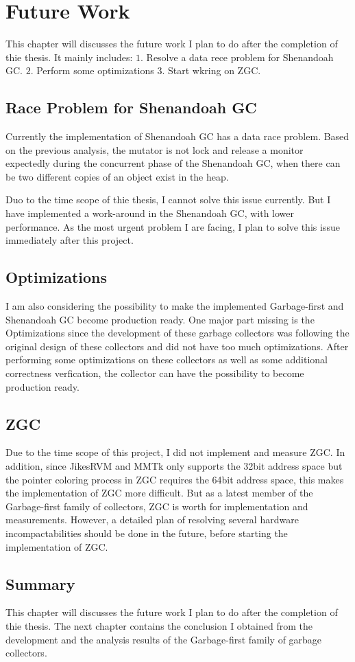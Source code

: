 \chapter{Future Work}
\label{cha:future}

This chapter will discusses the future work I plan to do after the completion
of thie thesis. It mainly includes:
$1.$ Resolve a data rece problem for Shenandoah GC.
$2.$ Perform some optimizations
$3.$ Start wkring on ZGC.

\section{Race Problem for Shenandoah GC}

Currently the implementation of Shenandoah GC has a data race problem.
Based on the previous analysis, the mutator is not lock and release a monitor
expectedly during the concurrent phase of the Shenandoah GC, when there can be
two different copies of an object exist in the heap.

Duo to the time scope of thie thesis, I cannot solve this issue currently.
But I have implemented a work-around in the Shenandoah GC, with lower performance.
As the most urgent problem I are facing, I plan to solve this issue immediately after
this project.

\section{Optimizations}

I am also considering the possibility to make the implemented Garbage-first
and Shenandoah GC become production ready. One major part missing is the Optimizations
since the development of these garbage collectors was following the original design
of these collectors and did not have too much optimizations. After performing some
optimizations on these collectors as well as some additional correctness verfication,
the collector can have the possibility to become production ready.

\section{ZGC}

Due to the time scope of this project, I did not implement and measure ZGC.
In addition, since JikesRVM and MMTk only supports the 32bit address space but the pointer
coloring process in ZGC requires the 64bit address space, this makes the implementation
of ZGC more difficult.
But as a latest member of the Garbage-first family of collectors, ZGC is
worth for implementation and measurements.
However, a detailed plan of resolving several hardware incompactabilities should be done in the future,
before starting the implementation of ZGC.

\section{Summary}

This chapter will discusses the future work I plan to do after the completion
of thie thesis. The next chapter contains the conclusion I obtained from the
development and the analysis results of the Garbage-first family of garbage collectors.